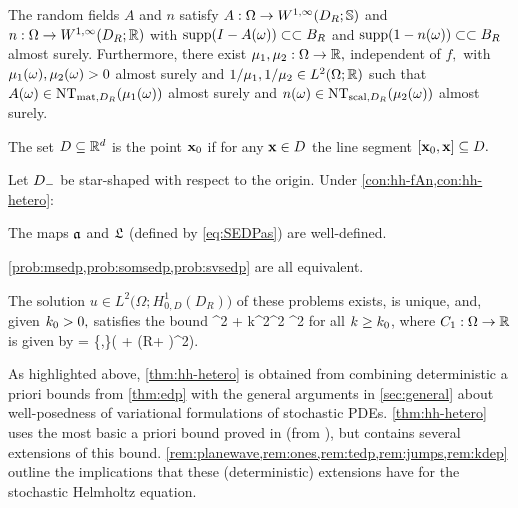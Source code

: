 
\label{con:hh-hetero}
The random fields $A$ and $n$ satisfy $A:\Omega\rightarrow\WoiDRRRdtd$ and $n:\Omega\rightarrow \WoiDRRR$ with $\operatorname{supp}(I-A(\omega)) \subset\subset B_{R}$ and $\operatorname{supp}(1-n(\omega)) \subset\subset B_{R}$ almost surely.  Furthermore, there exist $\mu_{1}, \mu_{2}:\Omega\rightarrow \mathbb R,$ independent of $f,$ with $\mu_{1}(\omega),\mu_{2}(\omega) > 0$ almost surely and $1/\muo,1/\mut \in \LtORR$  such that $A(\omega) \in \NTA{\muo(\omega)}$ almost surely and $n(\omega) \in \NTn{\mut(\omega)}$ almost surely.
\econ


The set $D \subseteq \mathbb R^{d}$ is  the point $\mathbf{x}_{0}$ if for any $\mathbf{x} \in D$ the line segment $\mleft[\bxz,\bx\mright] \subseteq D.$
\ede

\label{thm:hh-hetero}
Let $D_{-}$ be star-shaped with respect to the origin. Under \cref{con:hh-fAn,con:hh-hetero}:
\bit
\item The maps $\mathfrak{a}$ and $\mathfrak{L}$ (defined by \eqref{eq:SEDPas}) are well-defined.
\item \cref{prob:msedp,prob:somsedp,prob:svsedp} are all equivalent.
\item The solution $u \in %
L^2\big(\Omega;H_{0,D}^1(D_R)\big)$
of these problems exists, is unique, and, given $k_{0} > 0,$ satisfies the bound
\beq\label{eq:Sbound1}
^2 + k^2^2\leq \NLoO{\Co} ^2
\eeq
for all $k\geq k_{0}$, where $C_{1}:\Omega\rightarrow\mathbb R$ is given by
\beq\label{eq:C1}
\Co = \max\mleft\{,\mright\}\mleft( + \mleft(R+ \mright)^2\mright).
\eeq
\eit
\enth

As highlighted above, \cref{thm:hh-hetero} is obtained from combining
deterministic a priori bounds from \cref{thm:edp} with the general
arguments in \cref{sec:general} about well-posedness of variational
formulations of stochastic PDEs. \cref{thm:hh-hetero} uses the most basic a priori bound proved
in \cite{GrPeSp:19} (from \cite[Theorem 2.5]{GrPeSp:19}), but \cite{GrPeSp:19}
contains several extensions of this bound. \cref{rem:planewave,rem:ones,rem:tedp,rem:jumps,rem:kdep}
outline the implications that these (deterministic) extensions have for
the stochastic Helmholtz equation.

